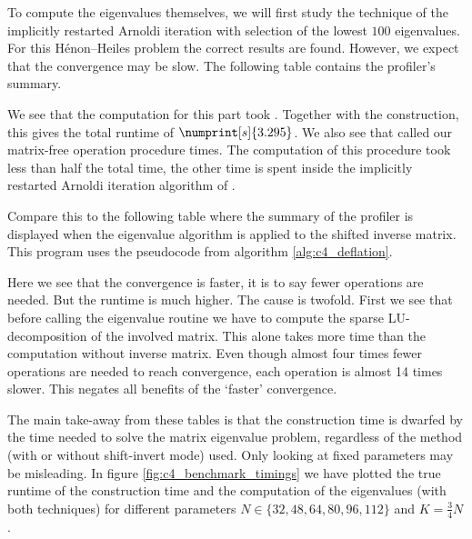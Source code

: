 To compute the eigenvalues themselves, we will first study the technique of the implicitly restarted Arnoldi iteration with selection of the lowest $100$ eigenvalues. For this Hénon--Heiles problem the correct results are found. However, we expect that the convergence may be slow. The following table contains the profiler's summary.
\begin{center}
    
\end{center}
We see that the computation for this part took . Together with the construction, this gives the total runtime of $\numprint[s]{3.295}$. We also see that \spectra{} called our matrix-free operation procedure  times. The computation of this procedure took less than half the total time, the other time is spent inside the implicitly restarted Arnoldi iteration algorithm of \spectra{}.

Compare this to the following table where the summary of the profiler is displayed when the eigenvalue algorithm is applied to the shifted inverse matrix. This program uses the pseudocode from algorithm \ref{alg:c4_deflation}.
\begin{center}
    
\end{center}
Here we see that the convergence is faster, it is to say fewer operations are needed. But the runtime  is much higher. The cause is twofold. First we see that before calling the eigenvalue routine we have to compute the sparse LU-decomposition of the involved matrix. This alone takes more time than the computation without inverse matrix. Even though almost four times fewer operations are needed to reach convergence, each operation is almost 14 times slower. This negates all benefits of the `faster' convergence.

The main take-away from these tables is that the construction time is dwarfed by the time needed to solve the matrix eigenvalue problem, regardless of the method (with or without shift-invert mode) used. Only looking at fixed parameters may be misleading. In figure \ref{fig:c4_benchmark_timings} we have plotted the true runtime of the construction time and the computation of the eigenvalues (with both techniques) for different parameters $N \in \{32,48,64,80,96,112\}$ and $K = \frac{3}{4}N$.

